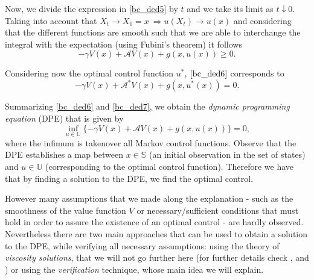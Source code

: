  
Now, we divide the expression in \eqref{bc_ded5} by $t$ and we take its limit as $t \downarrow 0$. Taking into account that $X_t \rightarrow X_0=x \ \Rightarrow u(X_t) \rightarrow u(x)$ and considering that the different functions are smooth such that we are able to 
interchange the integral with the expectation (using Fubini's theorem) it follows
\begin{equation}
 - \gamma V(x)+\mathcal{A}V(x)+g(x,u(x))\geq0.
 \label{bc_ded6}
\end{equation}

Considering now the optimal control function $u^*$, $\eqref{bc_ded6}$ corresponds to
\begin{equation}
- \gamma V(x)+\mathcal{A^*}V(x)+g(x,u^*(x))=0.
\label{bc_ded7}
\end{equation}

Summarizing \eqref{bc_ded6} and \eqref{bc_ded7}, we obtain the \textit{dynamic programming equation} (DPE) that is given by
\begin{equation}
	 \inf_{u \in \mathds{U}} \{  - \gamma V(x)+\mathcal{A}V(x)+g(x,u(x)) \}=0,
	 \label{bc_eq}
\end{equation}
where the infimum is takenover all Markov control functions.
Observe that the DPE establishes a map between $x \in \mathds{S}$ (an initial observation in the set of states) and $u \in \mathds{U}$ (corresponding to the optimal control function). Therefore we have that by finding a solution to the DPE, we find the optimal control.

However many assumptions that we made along the explanation - such as the smoothness of the value function $V$ or necessary/sufficient conditions that must hold in order to assure the existence of an optimal control - are hardly observed. Nevertheless there are two main approaches that can be used to obtain a solution to the DPE, while verifying all necessary assumptions: using the theory of \textit{viscosity solutions}, that we will not go further here (for further details check \cite{ross}, \cite{oksendal:book} and \cite{oksendal:book2}) or using the \textit{verification} technique, whose main idea we will explain.



